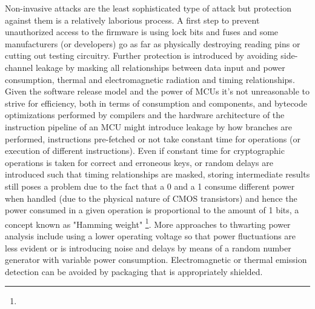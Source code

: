 Non-invasive attacks are the least sophisticated type of attack but protection against them is a relatively laborious process\citep{anderson:cautionary_note}. A first step to prevent unauthorized access to the firmware is using lock bits and fuses\citep{atmega_manual}\citep{tech:avrfreaks} and some manufacturers (or developers) go as far as physically destroying reading pins or cutting out testing circuitry\citep{sergei:thesis}. Further protection is introduced by avoiding side-channel leakage by masking all relationships between data input and power consumption, thermal and electromagnetic radiation and timing relationships\citep{kocher:DPA}\cite{sergei:thesis}. Given the software release model and the power of MCUs it's not unreasonable to strive for efficiency, both in terms of consumption and components, and bytecode optimizations performed by compilers and the hardware architecture of the instruction pipeline of an MCU might introduce leakage \citep{kocher:DPA}\citep{sergei:thesis} by how branches are performed, instructions pre-fetched or not take constant time for operations (or execution of different instructions). Even if constant time for cryptographic operations is taken for correct and erroneous keys, or random delays are introduced such that timing relationships are masked, storing intermediate results still poses a problem due to the fact that a 0 and a 1 consume different power when handled (due to the physical nature of CMOS transistors) and hence the power consumed in a given operation is proportional to the amount of 1 bits, a concept known as "Hamming weight" \citep{website:riscure}\citep{kocher:DPA}\footnote{}. More approaches to thwarting power analysis include using a lower operating voltage so that power fluctuations are less evident or is introducing noise and delays by means of a random number generator with variable power consumption\citep{kocher:DPA}\citep{hwre}. Electromagnetic or thermal emission detection can be avoided by packaging that is appropriately shielded\citep{website:ibm_secure}\citep{kocher:DPA}. 

